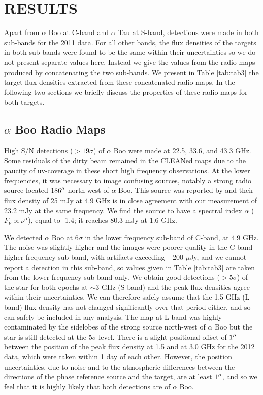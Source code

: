\documentclass[iop]{emulateapj}
\begin{document}
\section{RESULTS} 

Apart from $\alpha$ Boo at C-band and $\alpha$ Tau at S-band, detections were made in both sub-bands for the 2011 data. For all other bands, the flux densities of the targets in both sub-bands were found to be the same within their uncertainties so we do not present separate values here. Instead we give the values from the radio maps produced by concatenating the two sub-bands. We present in Table \ref{tab:tab3} the target flux densities extracted from these concatenated radio maps. In the following two sections we briefly discuss the properties of these radio maps for both targets.

\subsection{$\alpha$ Boo Radio Maps} \label{results1} 
High S/N detections ($>19\sigma$) of $\alpha$ Boo were made at 22.5, 33.6, and 43.3 GHz. Some residuals of the dirty beam remained in the CLEANed maps due to the paucity of uv-coverage in these short high frequency observations. At the lower frequencies, it was necessary to image confusing sources, notably a strong radio source located $186\mbox{$^{\prime\prime}$}$ north-west of $\alpha$ Boo. This source was reported by \cite{1986AJ.....91..602D} and their flux density of 25 mJy at 4.9 GHz is in close agreement with our measurement of 23.2 mJy at the same frequency. We find the source to have a spectral index $\alpha$ ($F_{\nu} \propto \nu ^{\alpha}$), equal to -1.4; it reaches 80.3 mJy at 1.6 GHz.

We detected $\alpha$ Boo at 6$\sigma$ in the lower frequency sub-band of C-band, at 4.9 GHz. The noise was slightly higher and the images were poorer quality in the C-band higher frequency sub-band, with artifacts exceeding $\pm$200 $\mu$Jy, and we cannot report a detection in this sub-band, so values given in Table \ref{tab:tab3} are taken from the lower frequency sub-band only. We obtain good detections ($>5\sigma$) of the star for both epochs at $\sim$3 GHz (S-band) and the peak flux densities agree within their uncertainties. We can therefore safely assume that the 1.5 GHz (L-band) flux density has not changed significantly over that period either, and so can safely be included in any analysis. The map at L-band was highly contaminated by the sidelobes of the strong source north-west of $\alpha$ Boo but the star is still detected at the $5\sigma$ level. There is a slight positional offset of $1\mbox{$^{\prime\prime}$}$ between the position of the peak flux density at 1.5 and at 3.0 GHz for the 2012 data, which were taken within 1 day of each other. However, the position uncertainties, due to noise and to the atmospheric differences between the directions of the phase reference source and the target, are at least $1\mbox{$^{\prime\prime}$}$, and so we feel that it is highly likely that both detections are of $\alpha$ Boo. 
\end{document}
